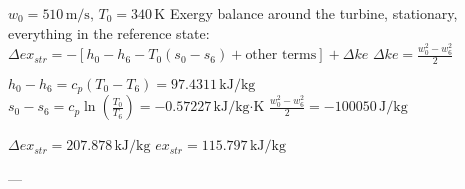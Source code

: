 \( w_0 = 510 \, \text{m/s}, \, T_0 = 340 \, \text{K} \)  
Exergy balance around the turbine, stationary, everything in the reference state:  
\( \Delta ex_{str} = -[h_0 - h_6 - T_0 (s_0 - s_6) + \text{other terms}] + \Delta ke \)  
\( \Delta ke = \frac{w_0^2 - w_6^2}{2} \)  

\( h_0 - h_6 = c_p (T_0 - T_6) = 97.4311 \, \text{kJ/kg} \)  
\( s_0 - s_6 = c_p \ln \left( \frac{T_0}{T_6} \right) = -0.57227 \, \text{kJ/kg·K} \)  
\( \frac{w_0^2 - w_6^2}{2} = -100050 \, \text{J/kg} \)  

\( \Delta ex_{str} = 207.878 \, \text{kJ/kg} \)  
\( ex_{str} = 115.797 \, \text{kJ/kg} \)  

---